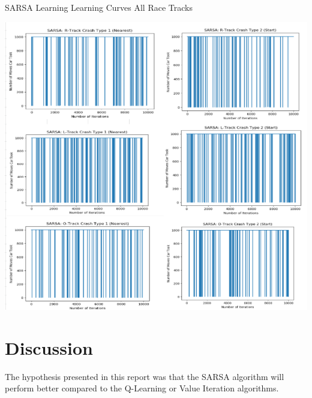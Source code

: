 \documentclass[twoside,11pt]{article}
\begin{document}
\newpage

\begin{table}[h]
	\centering
	\caption{SARSA Learning Learning Curves All Race Tracks }
	\label{tab:table3}
	\includegraphics[scale=.9]{SARSA_All_TrainCurve}\newline
\end{table}

\newpage

\section{Discussion}
\hspace*{10mm} The hypothesis presented in this report was that the SARSA algorithm will perform better compared to the Q-Learning or Value Iteration algorithms.\\
\end{document}
